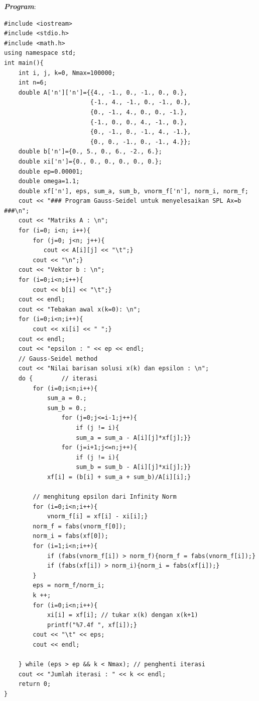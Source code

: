 \documentclass[paper=a4, fontsize=11pt]{scrartcl}
\numberwithin{equation}{section} %
\numberwithin{figure}{section} %
\numberwithin{table}{section} %
\begin{document}
\textit{\textbf{Program}}:
\begin{small}
\begin{verbatim}
#include <iostream>
#include <stdio.h>
#include <math.h>
using namespace std;
int main(){    
    int i, j, k=0, Nmax=100000;
    int n=6;
    double A['n']['n']={{4., -1., 0., -1., 0., 0.},
                        {-1., 4., -1., 0., -1., 0.},
                        {0., -1., 4., 0., 0., -1.},
                        {-1., 0., 0., 4., -1., 0.},
                        {0., -1., 0., -1., 4., -1.},
                        {0., 0., -1., 0., -1., 4.}};
    double b['n']={0., 5., 0., 6., -2., 6.};
    double xi['n']={0., 0., 0., 0., 0., 0.};
    double ep=0.00001;
    double omega=1.1;
    double xf['n'], eps, sum_a, sum_b, vnorm_f['n'], norm_i, norm_f;
    cout << "### Program Gauss-Seidel untuk menyelesaikan SPL Ax=b ###\n";    
    cout << "Matriks A : \n";
    for (i=0; i<n; i++){
        for (j=0; j<n; j++){ 
           cout << A[i][j] << "\t";}
        cout << "\n";}
    cout << "Vektor b : \n";
    for (i=0;i<n;i++){
        cout << b[i] << "\t";}
    cout << endl;
    cout << "Tebakan awal x(k=0): \n";
    for (i=0;i<n;i++){
        cout << xi[i] << " ";}
    cout << endl; 
    cout << "epsilon : " << ep << endl;
    // Gauss-Seidel method 
    cout << "Nilai barisan solusi x(k) dan epsilon : \n";
    do { 		// iterasi
        for (i=0;i<n;i++){
            sum_a = 0.;
            sum_b = 0.;
                for (j=0;j<=i-1;j++){
                    if (j != i){
                    sum_a = sum_a - A[i][j]*xf[j];}}
                for (j=i+1;j<=n;j++){
                    if (j != i){
                    sum_b = sum_b - A[i][j]*xi[j];}}
            xf[i] = (b[i] + sum_a + sum_b)/A[i][i];}
        
        // menghitung epsilon dari Infinity Norm
        for (i=0;i<n;i++){
            vnorm_f[i] = xf[i] - xi[i];}
        norm_f = fabs(vnorm_f[0]);
        norm_i = fabs(xf[0]);
        for (i=1;i<n;i++){
            if (fabs(vnorm_f[i]) > norm_f){norm_f = fabs(vnorm_f[i]);}
            if (fabs(xf[i]) > norm_i){norm_i = fabs(xf[i]);}
        }
        eps = norm_f/norm_i;
        k ++;      
        for (i=0;i<n;i++){
            xi[i] = xf[i]; // tukar x(k) dengan x(k+1)
            printf("%7.4f ", xf[i]);}
        cout << "\t" << eps;
        cout << endl;

    } while (eps > ep && k < Nmax); // penghenti iterasi
    cout << "Jumlah iterasi : " << k << endl;
    return 0;
}
\end{verbatim}
\end{small}
\end{document}

